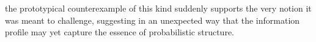 the prototypical counterexample of this kind
suddenly
supports the very notion it was meant to challenge, suggesting in an unexpected way that the information profile may yet capture the essence of probabilistic structure.

